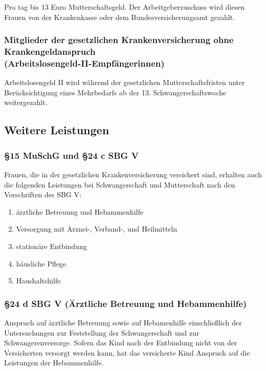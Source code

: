 \documentclass[a4paper, 12pt]{report}
\begin{document}
Pro tag bis 13 Euro Mutterschaftsgeld. Der Arbeitgeberzuschuss wird diesen
Frauen von der Krankenkasse oder dem Bundesversicherungsamt gezahlt.

\subsubsection{Mitglieder der gesetzlichen Krankenversicherung ohne
Krankengeldanspruch \\ (Arbeitslosengeld-II-Empfängerinnen)}

Arbeitslosengeld II wird während der gesetzlichen Mutterschaftsfristen unter
Berücksichtigung eines Mehrbedarfs ab der 13. Schwangerschaftswoche
weitergezahlt.

\newpage
\subsection{Weitere Leistungen}

\subsubsection{\S 15 MuSchG und \S 24 c SBG V}

Frauen, die in der gesetzlichen Krankenversicherung versichert sind, erhalten
auch die folgenden Leistungen bei Schwangerschaft und Mutterschaft nach den
Vorschriften des SBG V:

\begin{enumerate}
    \item ärztliche Betreuung und Hebammenhilfe
    \item Versorgung mit Arznei-, Verband-, und Heilmitteln
    \item stationäre Entbindung
    \item häusliche Pflege
    \item Haushaltshilfe
\end{enumerate}

\subsubsection{\S 24 d SBG V (Ärztliche Betreuung und Hebammenhilfe)}

Anspruch auf ärztliche Betreuung sowie auf Hebamenhilfe einschließlich der
Untersuchungen zur Feststellung der Schwangerschaft und zur Schwangerenversorge.
Sofern das Kind nach der Entbindung nicht von der Versicherten versorgt werden
kann, hat das versicherte Kind Anspruch auf die Leistungen der Hebammenhilfe.
\end{document}
